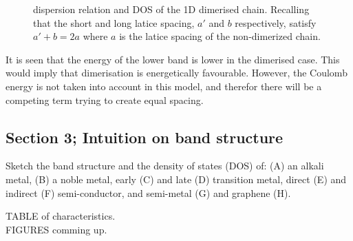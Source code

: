 \begin{solution}
\begin{figure}
    \centering
    
    \caption{dispersion relation and DOS of the 1D dimerised chain. Recalling that the short and long latice spacing, $a'$ and $b$ respectively, satisfy $a'+b = 2a$ where $a$ is the latice spacing of the non-dimerized chain.}
    \label{fig:1D_Dimer}
\end{figure}
It is seen that the energy of the lower band is lower in the dimerised case. This would imply that dimerisation is energetically favourable. However, the Coulomb energy is not taken into account in this model, and therefor there will be a competing term trying to create equal spacing. 
\end{solution}


\subsection{Section 3; Intuition on band structure}
\begin{exercise}
Sketch the band structure and the density of states (DOS) of: (A) an alkali
metal, (B) a noble metal, early (C) and late (D) transition metal, direct (E) and indirect (F) semi-conductor, and semi-metal (G) and graphene (H). 
\end{exercise}

\begin{solution}
TABLE of characteristics. \\
FIGURES comming up.
\end{solution}

